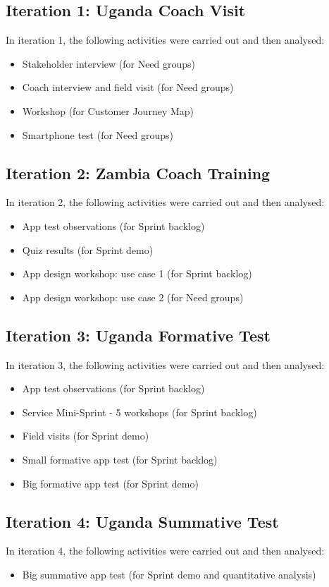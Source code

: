 \subsection{Iteration 1: Uganda Coach Visit}

In iteration 1, the following activities were carried out and then analysed:

\begin{itemize}
\item Stakeholder interview (for Need groups)
\item Coach interview and field visit (for Need groups)
\item Workshop (for Customer Journey Map)
\item Smartphone test (for Need groups)
\end{itemize}

\subsection{Iteration 2: Zambia Coach Training}

In iteration 2, the following activities were carried out and then analysed:

\begin{itemize}
\item App test observations (for Sprint backlog)
\item Quiz results (for Sprint demo)
\item App design workshop: use case 1 (for Sprint backlog)
\item App design workshop: use case 2 (for Need groups)
\end{itemize}

\subsection{Iteration 3: Uganda Formative Test}

In iteration 3, the following activities were carried out and then analysed:

\begin{itemize}
\item App test observations (for Sprint backlog)
\item Service Mini-Sprint - 5 workshops (for Sprint backlog)
\item Field visits (for Sprint demo)
\item Small formative app test (for Sprint backlog)
\item Big formative app test (for Sprint demo)
\end{itemize}

\subsection{Iteration 4: Uganda Summative Test}

In iteration 4, the following activities were carried out and then analysed:

\begin{itemize}
\item Big summative app test (for Sprint demo and quantitative analysis)
\end{itemize}


